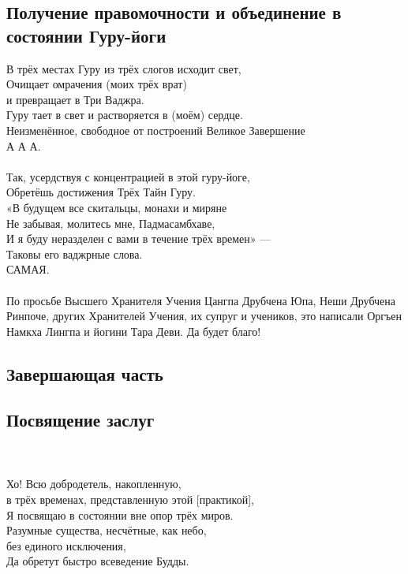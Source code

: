 \subsection*{Получение правомочности и объединение в состоянии Гуру-йоги}
В трёх местах Гуру из трёх слогов исходит свет,\\
Очищает омрачения (моих трёх врат) \\ \indent и превращает в Три Ваджра.\\
Гуру тает в свет и растворяется в (моём) сердце.\\
Неизменённое, свободное от построений Великое Завершение\\
\indent А А А.\\
\\
\scriptsize
Так, усердствуя с концентрацией в этой гуру-йоге,\\
Обретёшь достижения Трёх Тайн Гуру.\\
«В будущем все скитальцы, монахи и миряне\\
Не забывая, молитесь мне, Падмасамбхаве,\\
И я буду неразделен с вами в течение трёх времен» —\\
Таковы его ваджрные слова.\\
САМАЯ.\\
\\
По просьбе Высшего Хранителя Учения Цангпа Друбчена Юпа,
Неши Друбчена Ринпоче, других Хранителей Учения, их супруг и учеников,
это написали Оргъен Намкха Лингпа и йогини Тара Деви. Да будет благо!
\normalsize

\subsection{Завершающая часть}

\subsection*{Посвящение заслуг}\\
\\
Хо! Всю добродетель, накопленную, \\
\indent в трёх временах, представленную этой [практикой],\\
Я посвящаю в состоянии вне опор трёх миров.\\
Разумные существа, несчётные, как небо, \\
\indent без единого исключения,\\
Да обретут быстро всеведение Будды.\\
\\

